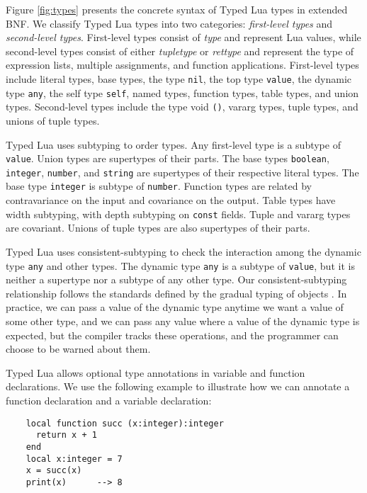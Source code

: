 Figure \ref{fig:types} presents the concrete syntax of
Typed Lua types in extended BNF.
We classify Typed Lua types into two categories:
\emph{first-level types} and \emph{second-level types}.
First-level types consist of \emph{type} and represent Lua values,
while second-level types consist of either \emph{tupletype} or
\emph{rettype} and represent the type of expression lists,
multiple assignments, and function applications.
First-level types include literal types, base types, the type \texttt{nil},
the top type \texttt{value}, the dynamic type \texttt{any},
the self type \texttt{self}, named types, function types, table types,
and union types.
Second-level types include the type void \texttt{()},
vararg types, tuple types, and unions of tuple types.

Typed Lua uses subtyping to order types.
Any first-level type is a subtype of \texttt{value}.
Union types are supertypes of their parts.
The base types \texttt{boolean}, \texttt{integer}, \texttt{number},
and \texttt{string} are supertypes of their respective literal types.
The base type \texttt{integer} is subtype of \texttt{number}.
Function types are related by contravariance on the input
and covariance on the output.
Table types have width subtyping, with depth subtyping on
\texttt{const} fields.
Tuple and vararg types are covariant.
Unions of tuple types are also supertypes of their parts.

Typed Lua uses consistent-subtyping to check the interaction among the
dynamic type \texttt{any} and other types.
The dynamic type \texttt{any} is a subtype of \texttt{value}, but it is
neither a supertype nor a subtype of any other type.
Our consistent-subtyping relationship follows the standards defined
by the gradual typing of objects \citep{siek2007objects,siek2013mutable}.
In practice, we can pass a value of the dynamic type anytime we want
a value of some other type, and we can pass any value where a
value of the dynamic type is expected, but the compiler tracks these
operations, and the programmer can choose to be warned about them.

Typed Lua allows optional type annotations in variable and function
declarations.
We use the following example to illustrate how we can annotate a
function declaration and a variable declaration:
\begin{verbatim}
    local function succ (x:integer):integer
      return x + 1
    end
    local x:integer = 7
    x = succ(x)
    print(x)      --> 8
\end{verbatim}

